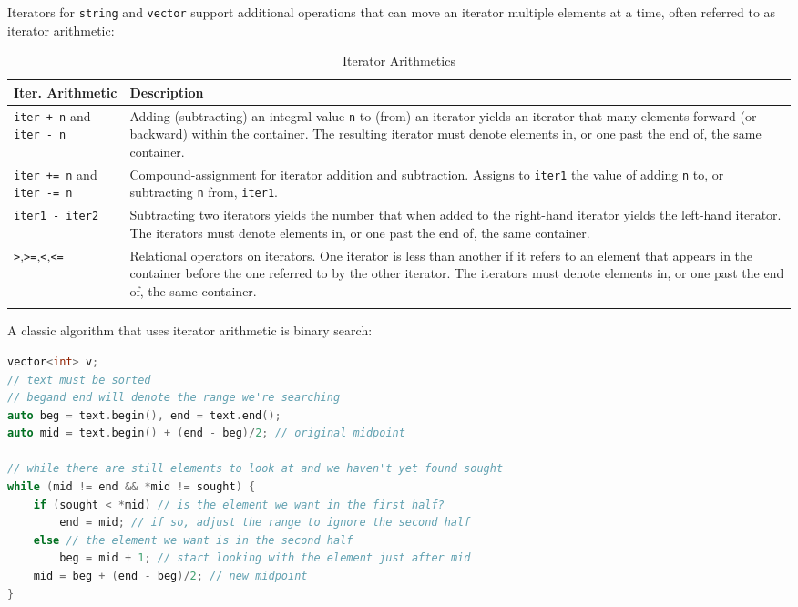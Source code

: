 Iterators for \texttt{string} and \texttt{vector} support additional operations that can move an iterator multiple elements at a time, often referred to as iterator arithmetic:
\begin{longtable}{p{.2\linewidth} p{.75\linewidth}} 
\toprule
Iter. Arithmetic & Description \\
\midrule
\endhead

\texttt{iter + n} and \texttt{iter - n}
&Adding (subtracting) an integral value \texttt{n} to (from) an iterator yields an iterator that many elements forward (or backward) within the container. The resulting iterator must denote elements in, or one past the end of, the same container.
\\

\texttt{iter += n} and \texttt{iter -= n}
&Compound-assignment for iterator addition and subtraction. Assigns to \texttt{iter1} the value of adding \texttt{n} to, or subtracting \texttt{n} from, \texttt{iter1}.
\\

\texttt{iter1 - iter2}
&Subtracting two iterators yields the number that when added to the right-hand iterator yields the left-hand iterator. The iterators must denote elements in, or one past the end of, the same container.
\\

\texttt{>},\texttt{>=},\texttt{<},\texttt{<=}
&Relational operators on iterators. One iterator is less than another if it refers to an element that appears in the container before the one referred to by the other iterator. The iterators must denote elements in, or one past the end of, the same container.
\\

\midrule
\caption{Iterator Arithmetics} 
\label{tab:iteratorarithmetics}
\end{longtable}

A classic algorithm that uses iterator arithmetic is binary search:
\begin{lstlisting}[language=C++]
vector<int> v;
// text must be sorted 
// begand end will denote the range we're searching 
auto beg = text.begin(), end = text.end(); 
auto mid = text.begin() + (end - beg)/2; // original midpoint 

// while there are still elements to look at and we haven't yet found sought 
while (mid != end && *mid != sought) { 
    if (sought < *mid) // is the element we want in the first half? 
        end = mid; // if so, adjust the range to ignore the second half 
    else // the element we want is in the second half 
        beg = mid + 1; // start looking with the element just after mid 
    mid = beg + (end - beg)/2; // new midpoint 
}
\end{lstlisting}

